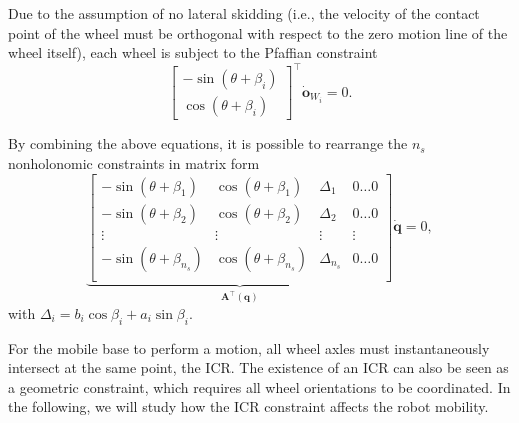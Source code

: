 Due to the assumption of no lateral skidding (i.e., the velocity of the contact
point of the wheel must be orthogonal with respect to the zero motion line of
the wheel itself), each wheel is subject to the Pfaffian constraint
\begin{equation}
    \label{eq:no-lateral-skidding-constraint}
    \begin{bmatrix}
        -\sin(\theta + \beta_i) \\
         \cos(\theta + \beta_i)
    \end{bmatrix}^\top \dot{\bm{o}}_{W_i} = 0.
\end{equation}

By combining the above equations, it is possible to rearrange the $n_s$
nonholonomic constraints in matrix form
\begin{equation}
    \label{eq:pfaffian-constraints-matrix-form}
    \underbrace{
    \begin{bmatrix}
        -\sin(\theta + \beta_1) &
        \cos(\theta + \beta_1) &
        \Delta_1 &
        0 \dots 0 \\
        -\sin(\theta + \beta_2) &
        \cos(\theta + \beta_2) &
        \Delta_2 &
        0 \dots 0 \\
        \vdots & \vdots & \vdots & \vdots \\
        -\sin(\theta + \beta_{n_s}) &
        \cos(\theta + \beta_{n_s}) &
        \Delta_{n_s} &
        0 \dots 0 \\
    \end{bmatrix}
    }_{\bm{A}^\top(\bm{q})}
    \dot{\bm{q}} = 0,
\end{equation}
with $\Delta_i = b_i \cos\beta_i + a_i \sin\beta_i$.

For the mobile base to perform a motion, all wheel axles must instantaneously
intersect at the same point, the ICR. The existence of an ICR can also be seen
as a geometric constraint, which requires all wheel orientations to be
coordinated. In the following, we will study how the ICR constraint affects
the robot mobility.


